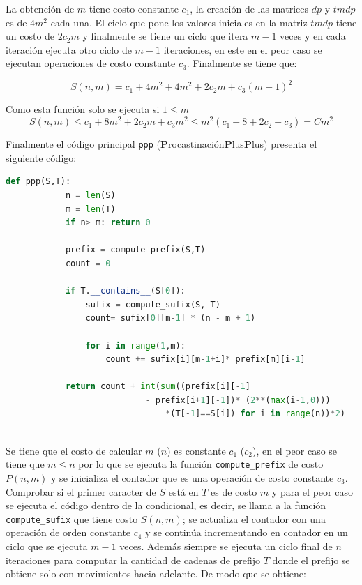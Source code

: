 \documentclass[a4paper]{article}
\begin{document}
    La obtenci\'on de $m$ tiene costo constante $c_1$, la creaci\'on de las matrices $dp$ y $tmdp$ es de $4m^2$ cada una.
    El ciclo que pone los valores iniciales en la matriz $tmdp$ tiene un costo de $2c_2m$ y finalmente se tiene  
    un ciclo que itera $m-1$ veces y en cada iteraci\'on ejecuta otro ciclo de $m-1$ iteraciones, en este en el peor caso se ejecutan 
    operaciones de costo constante $c_3$. Finalmente se tiene que: 

    $$S(n,m) = c_1 + 4m^2 + 4m^2 + 2c_2m + c_3(m-1)^2$$

    Como esta funci\'on solo se ejecuta si $1\leq m$
    $$S(n,m) \leq c_1 + 8m^2 + 2c_2m + c_3m^2 \leq m^2(c_1 + 8 +2c_2 + c_3) = Cm^2$$

    Finalmente el c\'odigo principal \texttt{ppp} (\textbf{P}rocastinaci\'on\textbf{P}lus\textbf{P}lus) presenta el siguiente c\'odigo:

    \begin{lstlisting}[language=Python]
        def ppp(S,T):
            n = len(S)
            m = len(T)
            if n> m: return 0
        
            prefix = compute_prefix(S,T)
            count = 0
        
            if T.__contains__(S[0]):
                sufix = compute_sufix(S, T)
                count= sufix[0][m-1] * (n - m + 1)
                
                for i in range(1,m):           
                    count += sufix[i][m-1+i]* prefix[m][i-1]
            
            return count + int(sum((prefix[i][-1] 
                            - prefix[i+1][-1])* (2**(max(i-1,0))) 
                                *(T[-1]==S[i]) for i in range(n))*2)
    
    \end{lstlisting}
    Se tiene que el costo de calcular $m$ ($n$) es constante $c_1$ ($c_2$), en el peor caso se tiene que $m \leq n$ por 
    lo que se ejecuta la funci\'on \texttt{compute\_prefix} de costo $P(n,m)$ y se inicializa el contador que es una operaci\'on de costo constante $c_3$.
    Comprobar si el primer caracter de $S$ est\'a en $T$  es de costo  $m$ y para el peor caso se ejecuta el c\'odigo dentro de la condicional, 
    es decir, se llama a la funci\'on \texttt{compute\_sufix} que tiene costo $S(n,m)$; se actualiza el contador con una operaci\'on de orden constante $c_4$ 
    y se contin\'ua incrementando en contador en un ciclo que se ejecuta $m-1$ veces. Adem\'as siempre se ejecuta un ciclo final 
    de $n$ iteraciones para computar la cantidad de cadenas de prefijo $T$ donde el prefijo se obtiene solo con movimientos hacia adelante. De modo que se obtiene: 
\end{document}
